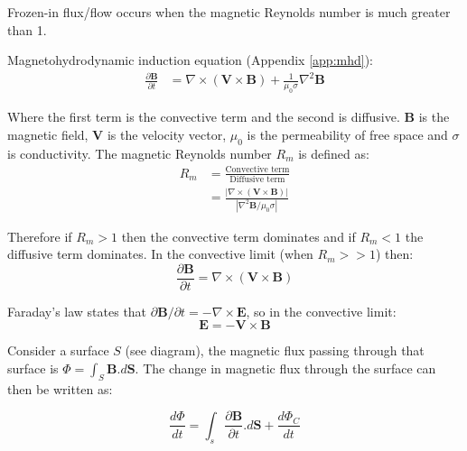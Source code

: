 \documentclass[12pt]{article}
\newcommand{\incfig}[2][1]{
    \def\svgwidth{#1\textwidth}
    
}
\begin{document}
\noindent Frozen-in flux/flow occurs when the magnetic Reynolds number is much greater than 1.


\noindent Magnetohydrodynamic induction equation (Appendix \ref{app:mhd}):
\begin{align}
    \frac{\partial \textbf{B}}{\partial t} &= \nabla \times (\textbf{V}\times\textbf{B})+\frac{1}{\mu_0\sigma}\nabla^2\textbf{B}
\end{align}

\noindent Where the first term is the convective term and the second is diffusive. $\textbf{B}$ is the magnetic field, \textbf{V} is the velocity vector, $\mu_0$ is the permeability of free space and $\sigma$ is conductivity. The magnetic Reynolds number $R_m$ is defined as:
\begin{align}
    R_m&=\frac{\text{Convective term}}{\text{Diffusive term}} \nonumber\\
    &=\frac{|\nabla\times(\textbf{V}\times\textbf{B})|}{|\nabla^2\textbf{B}/\mu_0\sigma|}
\end{align}

\noindent Therefore if $R_m>1$ then the convective term dominates and if $R_m<1$ the diffusive term dominates. In the convective limit (when $R_m>>1$) then:
\begin{equation}
    \frac{\partial\textbf{B}}{\partial t}=\nabla\times(\textbf{V}\times\textbf{B})
    \label{eq:convLim}
\end{equation}

\noindent Faraday's law states that $\partial\textbf{B}/\partial t=-\nabla\times\textbf{E}$, so in the convective limit:
\begin{equation}
    \textbf{E}=-\textbf{V}\times\textbf{B}
\end{equation}

\begin{figure}
    \hspace{1.5cm}
    \vspace{-5mm}
    \incfig[0.38]{frozen-in}
    \vspace{5mm}
\end{figure}

\noindent Consider a surface $S$ (see diagram), the magnetic flux passing through that surface is $\Phi=\int_S\textbf{B}.d\textbf{S}$. The change in magnetic flux through the surface can then be written as:

\begin{equation}
    \frac{d\Phi}{dt} = \int_s\frac{\partial\textbf{B}}{\partial t}.d\textbf{S} + \frac{d\Phi_C}{dt}
\end{equation}
\end{document}
